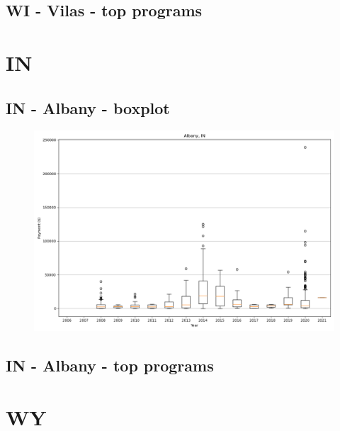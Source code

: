 \subsection*{WI - Vilas - top programs}

\newpage
\section*{IN}
\subsection*{IN - Albany - boxplot}
\begin{figure}[h]
\centering
\includegraphics[width=7in]{../output/boxplots/counties/Albany-IN_boxplot.png}
\end{figure}


\subsection*{IN - Albany - top programs}

\newpage
\section*{WY}
